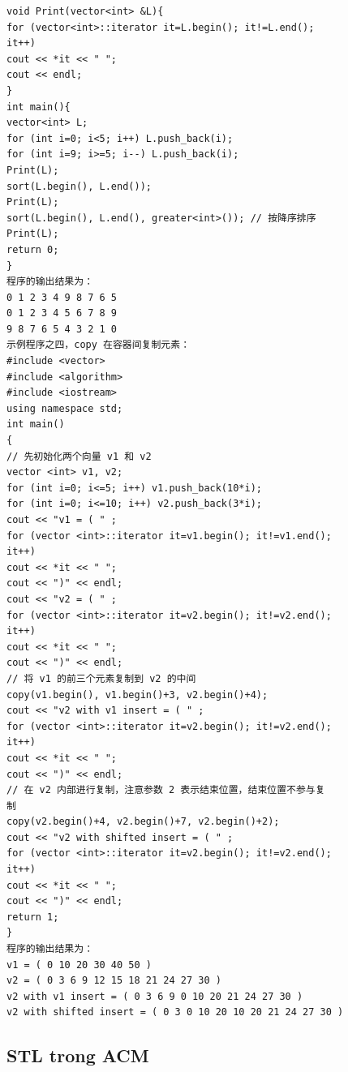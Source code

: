 \documentclass[11pt]{article}
\begin{document}
\begin{verbatim}
void Print(vector<int> &L){
for (vector<int>::iterator it=L.begin(); it!=L.end();
it++)
cout << *it << " ";
cout << endl;
}
int main(){
vector<int> L;
for (int i=0; i<5; i++) L.push_back(i);
for (int i=9; i>=5; i--) L.push_back(i);
Print(L);
sort(L.begin(), L.end());
Print(L);
sort(L.begin(), L.end(), greater<int>()); // 按降序排序
Print(L);
return 0;
}
程序的输出结果为：
0 1 2 3 4 9 8 7 6 5
0 1 2 3 4 5 6 7 8 9
9 8 7 6 5 4 3 2 1 0
示例程序之四，copy 在容器间复制元素：
#include <vector>
#include <algorithm>
#include <iostream>
using namespace std;
int main()
{
// 先初始化两个向量 v1 和 v2
vector <int> v1, v2;
for (int i=0; i<=5; i++) v1.push_back(10*i);
for (int i=0; i<=10; i++) v2.push_back(3*i);
cout << "v1 = ( " ;
for (vector <int>::iterator it=v1.begin(); it!=v1.end();
it++)
cout << *it << " ";
cout << ")" << endl;
cout << "v2 = ( " ;
for (vector <int>::iterator it=v2.begin(); it!=v2.end();
it++)
cout << *it << " ";
cout << ")" << endl;
// 将 v1 的前三个元素复制到 v2 的中间
copy(v1.begin(), v1.begin()+3, v2.begin()+4);
cout << "v2 with v1 insert = ( " ;
for (vector <int>::iterator it=v2.begin(); it!=v2.end();
it++)
cout << *it << " ";
cout << ")" << endl;
// 在 v2 内部进行复制，注意参数 2 表示结束位置，结束位置不参与复
制
copy(v2.begin()+4, v2.begin()+7, v2.begin()+2);
cout << "v2 with shifted insert = ( " ;
for (vector <int>::iterator it=v2.begin(); it!=v2.end();
it++)
cout << *it << " ";
cout << ")" << endl;
return 1;
}
程序的输出结果为：
v1 = ( 0 10 20 30 40 50 )
v2 = ( 0 3 6 9 12 15 18 21 24 27 30 )
v2 with v1 insert = ( 0 3 6 9 0 10 20 21 24 27 30 )
v2 with shifted insert = ( 0 3 0 10 20 10 20 21 24 27 30 )
\end{verbatim}
\endgroup

\subsection{STL trong ACM}
\end{document}
